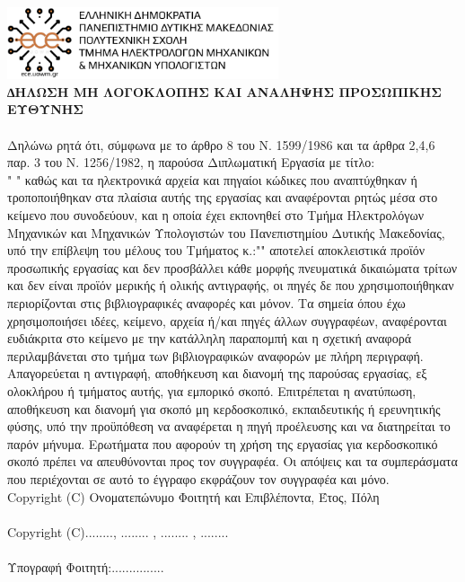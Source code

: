 \documentclass[../main.tex]{subfiles}
\begin{document}
\includegraphics[width=0.6\textwidth]{images/logo}
\vspace{0.5cm}
\\
\textbf{∆ΗΛΩΣΗ ΜΗ ΛΟΓΟΚΛΟΠΗΣ ΚΑΙ ΑΝΑΛΗΨΗΣ ΠΡΟΣΩΠΙΚΗΣ ΕΥΘΥΝΗΣ }
\\
\\

Δηλώνω ρητά ότι, σύμφωνα με το άρθρο 8 του Ν. 1599/1986 και τα άρθρα 2,4,6 παρ. 3 του Ν. 1256/1982, η παρούσα Διπλωματική Εργασία με τίτλο:\\ " \dotfill " καθώς και τα ηλεκτρονικά αρχεία και πηγαίοι κώδικες που αναπτύχθηκαν ή τροποποιήθηκαν στα πλαίσια αυτής της εργασίας και αναφέρονται ρητώς μέσα στο κείμενο που συνοδεύουν, και η οποία έχει εκπονηθεί στο Τμήμα Ηλεκτρολόγων Μηχανικών και Μηχανικών Υπολογιστών του Πανεπιστημίου Δυτικής Μακεδονίας, υπό την επίβλεψη του μέλους του Τμήματος κ.:"\dotfill" αποτελεί αποκλειστικά προϊόν προσωπικής εργασίας και δεν προσβάλλει κάθε μορφής πνευματικά δικαιώματα τρίτων και δεν είναι προϊόν μερικής ή ολικής αντιγραφής, οι πηγές δε που χρησιμοποιήθηκαν περιορίζονται στις βιβλιογραφικές αναφορές και μόνον. Τα σημεία όπου έχω χρησιμοποιήσει ιδέες, κείμενο, αρχεία ή/και πηγές άλλων συγγραφέων, αναφέρονται ευδιάκριτα στο κείμενο με την κατάλληλη παραπομπή και η σχετική αναφορά περιλαμβάνεται στο τμήμα των βιβλιογραφικών αναφορών με πλήρη περιγραφή. Απαγορεύεται η αντιγραφή, αποθήκευση και διανομή της παρούσας εργασίας, εξ ολοκλήρου ή τμήματος αυτής, για εμπορικό σκοπό. Επιτρέπεται η ανατύπωση, αποθήκευση και διανομή για σκοπό μη κερδοσκοπικό, εκπαιδευτικής ή ερευνητικής φύσης, υπό την προϋπόθεση να αναφέρεται η πηγή προέλευσης και να διατηρείται το παρόν μήνυμα. Ερωτήματα που αφορούν τη χρήση της εργασίας για κερδοσκοπικό σκοπό πρέπει να απευθύνονται προς τον συγγραφέα. Οι απόψεις και τα συμπεράσματα που περιέχονται σε αυτό το έγγραφο εκφράζουν τον συγγραφέα και μόνο.\\

Copyright (C) Ονοματεπώνυμο Φοιτητή και Επιβλέποντα, Έτος, Πόλη 
\\\\
Copyright (C)........, ........ , ........ , ........
\\\\
Υπογραφή Φοιτητή:...............

\clearpage
\end{document}
